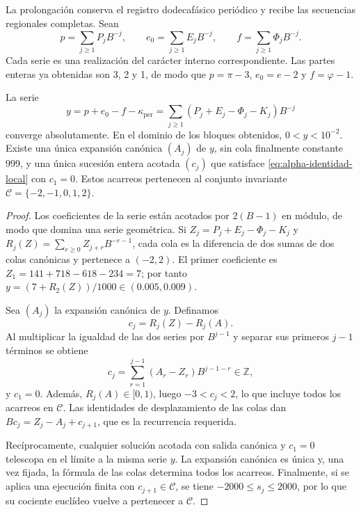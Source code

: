 La prolongación conserva el registro dodecafásico periódico y recibe las secuencias
regionales completas. Sean
\[
 p=\sum_{j\geq1}P_jB^{-j},\qquad
 e_0=\sum_{j\geq1}E_jB^{-j},\qquad
 f=\sum_{j\geq1}\Phi_jB^{-j}.
\]
Cada serie es una realización del carácter interno correspondiente.
Las partes enteras ya obtenidas son 3, 2 y 1, de modo que
\(p=\pi-3\), \(e_0=e-2\) y
\(f=\varphi-1\).

\begin{proposition}
\label{prop:alpha-normalizacion}
La serie
\begin{equation}
 y=p+e_0-f-\kappa_{\mathrm{per}}
   =\sum_{j\geq1}(P_j+E_j-\Phi_j-K_j)B^{-j}
 \label{eq:alpha-serie}
\end{equation}
converge absolutamente. En el dominio de los bloques obtenidos,
\(0<y<10^{-2}\). Existe una única expansión canónica \((A_j)\) de
\(y\), sin cola finalmente constante 999, y una única sucesión entera
acotada \((c_j)\) que satisface \eqref{eq:alpha-identidad-local} con
\(c_1=0\). Estos acarreos pertenecen al conjunto invariante
\(\mathcal C=\{-2,-1,0,1,2\}\).
\end{proposition}

\begin{proof}
Los coeficientes de la serie están acotados por \(2(B-1)\) en módulo,
de modo que domina una serie geométrica. Si
\(Z_j=P_j+E_j-\Phi_j-K_j\) y
\(R_j(Z)=\sum_{r\geq0}Z_{j+r}B^{-r-1}\), cada cola es la diferencia
de dos sumas de dos colas canónicas y pertenece a \((-2,2)\).
El primer coeficiente es
\(Z_1=141+718-618-234=7\); por tanto
\(y=(7+R_2(Z))/1000\in(0.005,0.009)\).

Sea \((A_j)\) la expansión canónica de \(y\). Definamos
\[
 c_j=R_j(Z)-R_j(A).
\]
Al multiplicar la igualdad de las dos series por \(B^{j-1}\) y separar
sus primeros \(j-1\) términos se obtiene
\[
 c_j=\sum_{r=1}^{j-1}(A_r-Z_r)B^{j-1-r}\in\mathbb Z,
\]
y \(c_1=0\). Además, \(R_j(A)\in[0,1)\), luego
\(-3<c_j<2\), lo que incluye todos los acarreos en \(\mathcal C\).
Las identidades de desplazamiento de las colas dan
\(Bc_j=Z_j-A_j+c_{j+1}\), que es la recurrencia requerida.

Recíprocamente, cualquier solución acotada con salida canónica y
\(c_1=0\) telescopa en el límite a la misma serie \(y\). La expansión
canónica es única y, una vez fijada, la fórmula de las colas determina
todos los acarreos. Finalmente, si se aplica una ejecución finita con
\(c_{j+1}\in\mathcal C\), se tiene \(-2000\leq s_j\leq2000\),
por lo que su cociente euclídeo vuelve a pertenecer a \(\mathcal C\).
\end{proof}


